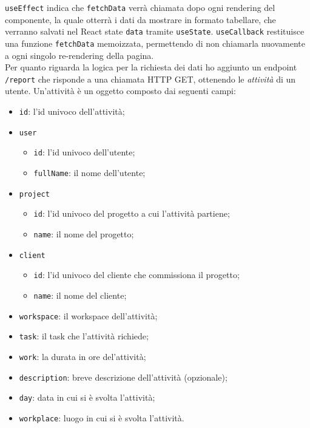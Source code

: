 \noindent \texttt{useEffect} indica che \texttt{fetchData} verrà chiamata dopo ogni rendering del componente, la quale otterrà i dati da mostrare in formato tabellare, che verranno salvati nel React state \texttt{data} tramite \texttt{useState}.
\texttt{useCallback} restituisce una funzione \texttt{fetchData} memoizzata, permettendo di non chiamarla nuovamente a ogni singolo re-rendering della pagina.\\
Per quanto riguarda la logica per la richiesta dei dati ho aggiunto un endpoint \texttt{/report} che risponde a una chiamata HTTP GET, ottenendo le \textit{attività} di un utente. Un'attività è un oggetto composto dai seguenti campi:
\begin{itemize}
  \item \texttt{id}: l'id univoco dell'attività;
  \item \texttt{user}
  \begin{itemize}
    \item \texttt{id}: l'id univoco dell'utente;
    \item \texttt{fullName}: il nome dell'utente;  
  \end{itemize}
  \item \texttt{project}
  \begin{itemize}
    \item \texttt{id}: l'id univoco del progetto a cui l'attività partiene;
    \item \texttt{name}: il nome del progetto;
  \end{itemize}
  \item \texttt{client}
  \begin{itemize}
    \item \texttt{id}: l'id univoco del cliente che commissiona il progetto;
    \item \texttt{name}: il nome del cliente;
  \end{itemize}
  \item \texttt{workspace}: il workspace dell'attività;
  \item \texttt{task}: il task che l'attività richiede;
  \item \texttt{work}: la durata in ore del'attività;
  \item \texttt{description}: breve descrizione dell'attività (opzionale);
  \item \texttt{day}: data in cui si è svolta l'attività;
  \item \texttt{workplace}: luogo in cui si è svolta l'attività.
\end{itemize}

